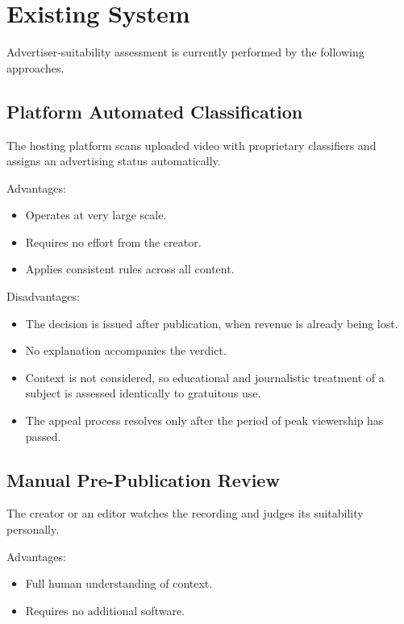 \documentclass[12pt,a4paper,twoside]{report}
\begin{document}
\section{Existing System}

Advertiser-suitability assessment is currently performed by the following approaches.

\subsection{Platform Automated Classification}

The hosting platform scans uploaded video with proprietary classifiers and assigns an advertising status automatically.

Advantages:

\begin{itemize}
\item Operates at very large scale.
\item Requires no effort from the creator.
\item Applies consistent rules across all content.
\end{itemize}

Disadvantages:

\begin{itemize}
\item The decision is issued after publication, when revenue is already being lost.
\item No explanation accompanies the verdict.
\item Context is not considered, so educational and journalistic treatment of a subject is assessed identically to gratuitous use.
\item The appeal process resolves only after the period of peak viewership has passed.
\end{itemize}

\subsection{Manual Pre-Publication Review}

The creator or an editor watches the recording and judges its suitability personally.

Advantages:

\begin{itemize}
\item Full human understanding of context.
\item Requires no additional software.
\end{itemize}
\end{document}
